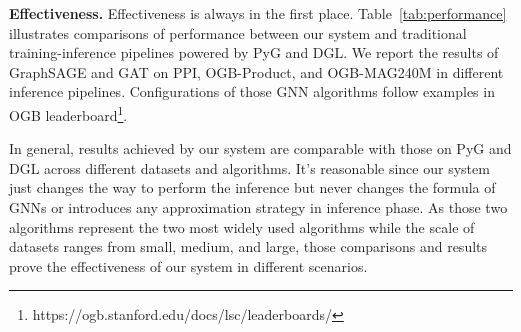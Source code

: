 \documentclass[conference]{IEEEtran}
\begin{document}
\textbf{Effectiveness.} 
Effectiveness is always in the first place. Table~\ref{tab:performance} illustrates comparisons of performance between our system and traditional training-inference pipelines powered by PyG and DGL.
We report the results of GraphSAGE and GAT on PPI, OGB-Product, and OGB-MAG240M in different inference pipelines.
Configurations of those GNN algorithms follow examples in OGB leaderboard\footnote{https://ogb.stanford.edu/docs/lsc/leaderboards/}.

In general, results achieved by our system are comparable with those on PyG and DGL across different datasets and algorithms.
It's reasonable since our system just changes the way to perform the inference but never changes the formula of GNNs or introduces any approximation strategy in inference phase.
As those two algorithms represent the two most widely used algorithms while the scale of datasets ranges from small, medium, and large, those comparisons and results prove the effectiveness of our system in different scenarios.


%



\end{document}
